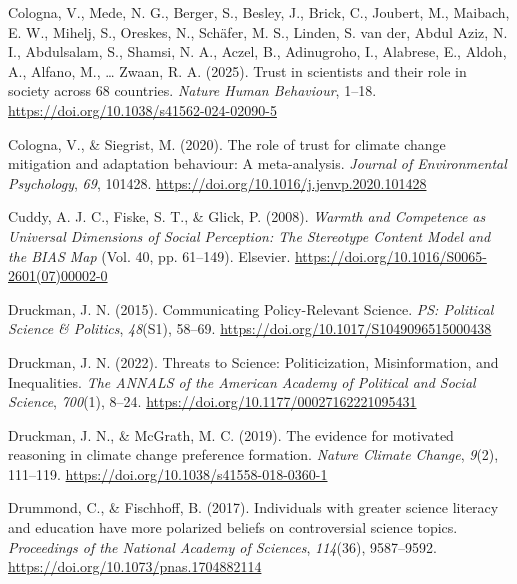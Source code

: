 \documentclass[
  jou,
  floatsintext,
  longtable,
  nolmodern,
  notxfonts,
  notimes,
  colorlinks=true,linkcolor=blue,citecolor=blue,urlcolor=blue]{apa7}
\newlength{\cslhangindent}
\newenvironment{CSLReferences}[2] %
 {\begin{list}{}{%
  \setlength{\itemindent}{0pt}
  \setlength{\leftmargin}{0pt}
  \setlength{\parsep}{0pt}
  \ifodd #1
   \setlength{\leftmargin}{\cslhangindent}
   \setlength{\itemindent}{-1\cslhangindent}
  \fi
  \setlength{\itemsep}{#2\baselineskip}}}
 {\end{list}}
\begin{document}
\begin{CSLReferences}{1}{0}
Cologna, V., Mede, N. G., Berger, S., Besley, J., Brick, C., Joubert,
M., Maibach, E. W., Mihelj, S., Oreskes, N., Schäfer, M. S., Linden, S.
van der, Abdul Aziz, N. I., Abdulsalam, S., Shamsi, N. A., Aczel, B.,
Adinugroho, I., Alabrese, E., Aldoh, A., Alfano, M., \ldots{} Zwaan, R.
A. (2025). Trust in scientists and their role in society across 68
countries. \emph{Nature Human Behaviour}, 1--18.
\url{https://doi.org/10.1038/s41562-024-02090-5}

Cologna, V., \& Siegrist, M. (2020). The role of trust for climate
change mitigation and adaptation behaviour: A meta-analysis.
\emph{Journal of Environmental Psychology}, \emph{69}, 101428.
\url{https://doi.org/10.1016/j.jenvp.2020.101428}

Cuddy, A. J. C., Fiske, S. T., \& Glick, P. (2008). \emph{Warmth and
Competence as Universal Dimensions of Social Perception: The Stereotype
Content Model and the BIAS Map} (Vol. 40, pp. 61--149). Elsevier.
\url{https://doi.org/10.1016/S0065-2601(07)00002-0}

Druckman, J. N. (2015). Communicating Policy-Relevant Science. \emph{PS:
Political Science \& Politics}, \emph{48}(S1), 58--69.
\url{https://doi.org/10.1017/S1049096515000438}

Druckman, J. N. (2022). Threats to Science: Politicization,
Misinformation, and Inequalities. \emph{The ANNALS of the American
Academy of Political and Social Science}, \emph{700}(1), 8--24.
\url{https://doi.org/10.1177/00027162221095431}

Druckman, J. N., \& McGrath, M. C. (2019). The evidence for motivated
reasoning in climate change preference formation. \emph{Nature Climate
Change}, \emph{9}(2), 111--119.
\url{https://doi.org/10.1038/s41558-018-0360-1}

Drummond, C., \& Fischhoff, B. (2017). Individuals with greater science
literacy and education have more polarized beliefs on controversial
science topics. \emph{Proceedings of the National Academy of Sciences},
\emph{114}(36), 9587--9592.
\url{https://doi.org/10.1073/pnas.1704882114}


\end{CSLReferences}
\end{document}
